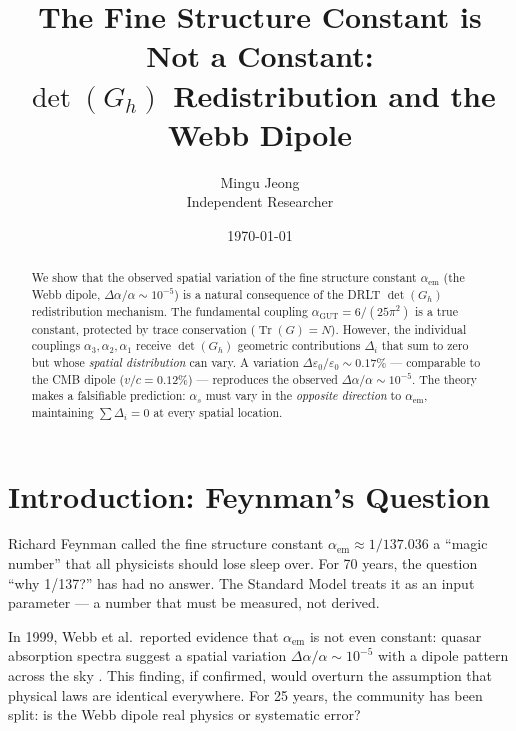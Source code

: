 \documentclass[12pt]{article}
\theoremstyle{remark}
\begin{document}
\title{The Fine Structure Constant is Not a Constant:\\$\det(G_h)$ Redistribution and the Webb Dipole}
\author{Mingu Jeong\\Independent Researcher}
\date{\today}
\maketitle

\begin{abstract}
We show that the observed spatial variation of the fine structure constant $\alpha_\text{em}$ (the Webb dipole, $\Delta\alpha/\alpha \sim 10^{-5}$) is a natural consequence of the DRLT $\det(G_h)$ redistribution mechanism. The fundamental coupling $\alpha_\text{GUT} = 6/(25\pi^2)$ is a true constant, protected by trace conservation ($\operatorname{Tr}(G) = N$). However, the individual couplings $\alpha_3, \alpha_2, \alpha_1$ receive $\det(G_h)$ geometric contributions $\Delta_i$ that sum to zero but whose \emph{spatial distribution} can vary. A variation $\Delta\varepsilon_0/\varepsilon_0 \sim 0.17\%$ --- comparable to the CMB dipole ($v/c = 0.12\%$) --- reproduces the observed $\Delta\alpha/\alpha \sim 10^{-5}$. The theory makes a falsifiable prediction: $\alpha_s$ must vary in the \emph{opposite direction} to $\alpha_\text{em}$, maintaining $\sum\Delta_i = 0$ at every spatial location.
\end{abstract}

\tableofcontents

\section{Introduction: Feynman's Question}

Richard Feynman called the fine structure constant $\alpha_\text{em} \approx 1/137.036$ a ``magic number'' that all physicists should lose sleep over. For 70 years, the question ``why 1/137?'' has had no answer. The Standard Model treats it as an input parameter --- a number that must be measured, not derived.

In 1999, Webb et al.\ reported evidence that $\alpha_\text{em}$ is not even constant: quasar absorption spectra suggest a spatial variation $\Delta\alpha/\alpha \sim 10^{-5}$ with a dipole pattern across the sky \cite{Webb}. This finding, if confirmed, would overturn the assumption that physical laws are identical everywhere. For 25 years, the community has been split: is the Webb dipole real physics or systematic error?
\end{document}
